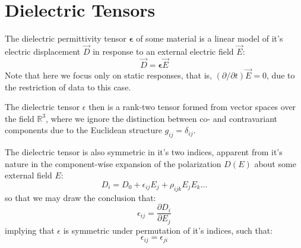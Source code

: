 \documentclass[10pt,a4paper]{article}
\begin{document}
\section{Dielectric Tensors}
The dielectric permittivity tensor  $\mathbf{\epsilon}$ of some material is a linear model of it's electric displacement $\vec{D}$ in response to an external electric field $\vec{E}$:
$$
\vec{D}=\mathbf{\epsilon}\vec{E}
$$
Note that here we focus only on static responses, that is, $(\partial/\partial t)\vec{E}=0$, due to the restriction of data to this case. 

The dielectric tensor $\epsilon$ then is a rank-two tensor formed from vector spaces over the field $\mathbb{R}^3$, where we ignore the distinction between co- and contravariant components due to the Euclidean structure $g_{ij}=\delta_{ij}$.

The dielectric tensor is also symmetric in it's two indices, apparent from it's nature in the component-wise expansion of the polarization $D(E)$ about some external field $E$:
$$
D_i = D_0 + \epsilon_{ij} E_j + \rho_{ijk}E_jE_k ...
$$
so that we may draw the conclusion that:
$$
\epsilon_{ij} = \frac{\partial D_i}{\partial E_j}
$$
implying that $\epsilon$ is symmetric under permutation of it's indices, such that:
$$
\epsilon_{ij}=\epsilon_{ji}
$$
\end{document}
